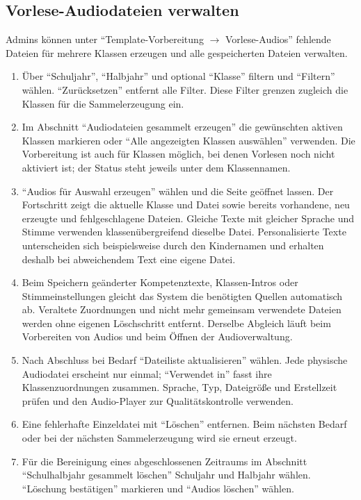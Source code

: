 \documentclass[12pt,a4paper]{article}
\begin{document}
\subsection*{Vorlese-Audiodateien verwalten}
Admins können unter \enquote{Template-Vorbereitung \(\rightarrow\) Vorlese-Audios} fehlende Dateien für mehrere Klassen erzeugen und alle gespeicherten Dateien verwalten.
\begin{enumerate}
  \item Über \enquote{Schuljahr}, \enquote{Halbjahr} und optional \enquote{Klasse} filtern und \enquote{Filtern} wählen. \enquote{Zurücksetzen} entfernt alle Filter. Diese Filter grenzen zugleich die Klassen für die Sammelerzeugung ein.
  \item Im Abschnitt \enquote{Audiodateien gesammelt erzeugen} die gewünschten aktiven Klassen markieren oder \enquote{Alle angezeigten Klassen auswählen} verwenden. Die Vorbereitung ist auch für Klassen möglich, bei denen Vorlesen noch nicht aktiviert ist; der Status steht jeweils unter dem Klassennamen.
  \item \enquote{Audios für Auswahl erzeugen} wählen und die Seite geöffnet lassen. Der Fortschritt zeigt die aktuelle Klasse und Datei sowie bereits vorhandene, neu erzeugte und fehlgeschlagene Dateien. Gleiche Texte mit gleicher Sprache und Stimme verwenden klassenübergreifend dieselbe Datei. Personalisierte Texte unterscheiden sich beispielsweise durch den Kindernamen und erhalten deshalb bei abweichendem Text eine eigene Datei.
  \item Beim Speichern geänderter Kompetenztexte, Klassen-Intros oder Stimmeinstellungen gleicht das System die benötigten Quellen automatisch ab. Veraltete Zuordnungen und nicht mehr gemeinsam verwendete Dateien werden ohne eigenen Löschschritt entfernt. Derselbe Abgleich läuft beim Vorbereiten von Audios und beim Öffnen der Audioverwaltung.
  \item Nach Abschluss bei Bedarf \enquote{Dateiliste aktualisieren} wählen. Jede physische Audiodatei erscheint nur einmal; \enquote{Verwendet in} fasst ihre Klassenzuordnungen zusammen. Sprache, Typ, Dateigröße und Erstellzeit prüfen und den Audio-Player zur Qualitätskontrolle verwenden.
  \item Eine fehlerhafte Einzeldatei mit \enquote{Löschen} entfernen. Beim nächsten Bedarf oder bei der nächsten Sammelerzeugung wird sie erneut erzeugt.
  \item Für die Bereinigung eines abgeschlossenen Zeitraums im Abschnitt \enquote{Schulhalbjahr gesammelt löschen} Schuljahr und Halbjahr wählen. \enquote{Löschung bestätigen} markieren und \enquote{Audios löschen} wählen.
\end{enumerate}
\end{document}
